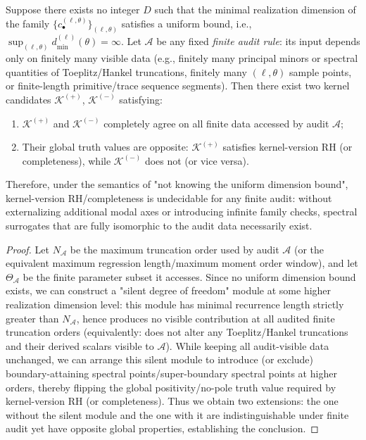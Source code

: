 \begin{theorem}[Spectral surrogates: no uniform dimension bound \texorpdfstring{$\Longrightarrow$}{=>} undecidability under any finite audit]\label{thm:xi-spectral-surrogate-finite-audit-undecidable}
Suppose there exists no integer \(D\) such that the minimal realization dimension of the family \(\{c^{(\ell,\theta)}_\bullet\}_{(\ell,\theta)}\) satisfies a uniform bound, i.e.,
\(
\sup_{(\ell,\theta)}d_{\min}^{(\ell)}(\theta)=\infty
\).
Let \(\mathcal A\) be any fixed \emph{finite audit rule}: its input depends only on finitely many visible data (e.g., finitely many principal minors or spectral quantities of Toeplitz/Hankel truncations, finitely many \((\ell,\theta)\) sample points, or finite-length primitive/trace sequence segments).
Then there exist two kernel candidates \(\mathcal K^{(+)}\), \(\mathcal K^{(-)}\) satisfying:
\begin{enumerate}
  \item \(\mathcal K^{(+)}\) and \(\mathcal K^{(-)}\) completely agree on all finite data accessed by audit \(\mathcal A\);
  \item Their global truth values are opposite: \(\mathcal K^{(+)}\) satisfies kernel-version RH (or completeness), while \(\mathcal K^{(-)}\) does not (or vice versa).
\end{enumerate}
Therefore, under the semantics of "not knowing the uniform dimension bound", kernel-version RH/completeness is undecidable for any finite audit: without externalizing additional modal axes or introducing infinite family checks, spectral surrogates that are fully isomorphic to the audit data necessarily exist.
\end{theorem}

\begin{proof}
Let \(N_{\mathcal A}\) be the maximum truncation order used by audit \(\mathcal A\) (or the equivalent maximum regression length/maximum moment order window), and let \(\Theta_{\mathcal A}\) be the finite parameter subset it accesses.
Since no uniform dimension bound exists, we can construct a "silent degree of freedom" module at some higher realization dimension level: this module has minimal recurrence length strictly greater than \(N_{\mathcal A}\), hence produces no visible contribution at all audited finite truncation orders (equivalently: does not alter any Toeplitz/Hankel truncations and their derived scalars visible to \(\mathcal A\)).
While keeping all audit-visible data unchanged, we can arrange this silent module to introduce (or exclude) boundary-attaining spectral points/super-boundary spectral points at higher orders, thereby flipping the global positivity/no-pole truth value required by kernel-version RH (or completeness).
Thus we obtain two extensions: the one without the silent module and the one with it are indistinguishable under finite audit yet have opposite global properties, establishing the conclusion.
\end{proof}

